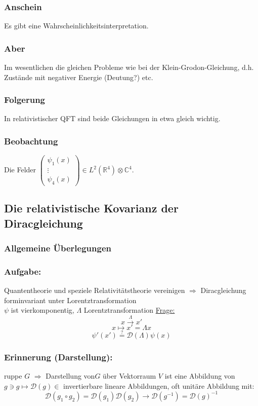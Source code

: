 \documentclass[twoside,a4paper]{scrartcl}
\newcommand{\R}{\mathbb{R}}
\newcommand{\C}{\mathbb{C}}
\newcommand{\D}{\mathcal{D}}
\renewcommand{\1}{\mathds{1}}
\newcommand{\Ra}{\Rightarrow}
\newcommand{\ra}{\rightarrow}
\renewcommand{\L}{\Lambda}
\renewcommand{\R}{\mathbb{R}}
\renewcommand{\C}{\mathbb{C}}
\begin{document}
\subsubsection*{Anschein}
Es gibt eine Wahrscheinlichkeitsinterpretation.
\subsubsection*{Aber}
Im wesentlichen die gleichen Probleme wie bei der Klein-Grodon-Gleichung, d.h. Zustände mit negativer Energie (Deutung?) etc.
\subsubsection*{Folgerung}
In relativistischer QFT sind beide Gleichungen in etwa gleich wichtig.
\subsubsection*{Beobachtung}
Die Felder $\begin{pmatrix}\psi_1(x) \\ \vdots \\ \psi_4(x)\end{pmatrix}\in L^2(\R^4)\otimes \C^4$.

\subsection{Die relativistische Kovarianz der Diracgleichung}
\subsubsection{Allgemeine Überlegungen}
\subsubsection*{Aufgabe:}
Quantentheorie und speziele Relativitätstheorie vereinigen $\Ra$ Diracgleichung forminvariant unter Lorentztransformation\\
$\psi$ ist vierkomponentig, $\L$ Lorentztransformation \underline{Frage:}\\
$$x \stackrel{\L}{\ra} x'$$
$$x \mapsto x'=\L x$$
$$\psi'(x')\stackrel{?}{=} \D(\L) \psi(x)$$
\subsubsection*{Erinnerung (Darstellung):}
ruppe $G$ $\Ra$ Darstellung von$G$ über Vektorraum $V$ ist eine Abbildung von $g \ni g \mapsto \D(g)\in$ invertierbare lineare Abbildungen, oft unitäre Abbildung mit:
$$\D(g_1\circ g_2)=\D(g_1)\D(g_2) \ra \D(g^{-1})=\D(g)^{-1}$$
\end{document}
